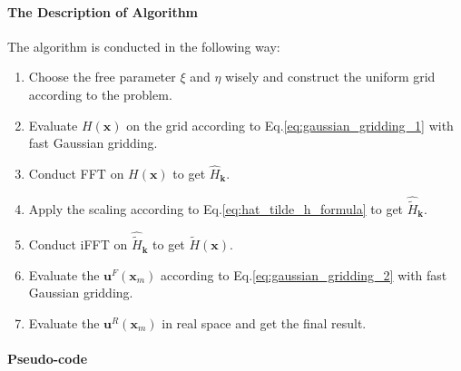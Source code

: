 \documentclass{article}[12pt]
\begin{document}
\paragraph{The Description of Algorithm}
The algorithm is conducted in the following way:
\begin{enumerate}[(1)]
	\item Choose the free parameter $\xi$ and $\eta$ wisely and construct the uniform grid according to the problem.
	\item Evaluate $H(\mathbf{x})$ on the grid according to Eq.\eqref{eq:gaussian_gridding_1} with fast Gaussian gridding.
	\item Conduct FFT on $H(\mathbf{x})$ to get $\hat{H}_{\mathbf{k}}$.
	\item Apply the scaling according to Eq.\eqref{eq:hat_tilde_h_formula} to get $\hat{\tilde{H}}_{\mathbf{k}}$.
	\item Conduct iFFT on $\hat{\tilde{H}}_{\mathbf{k}}$ to get $\tilde{H}(\mathbf{x})$.
	\item Evaluate the $\mathbf{u}^F (\mathbf{x}_m)$ according to Eq.\eqref{eq:gaussian_gridding_2} with fast Gaussian gridding.
	\item Evaluate the $\mathbf{u}^R (\mathbf{x}_m)$ in real space and get the final result.
\end{enumerate}

\paragraph{Pseudo-code}
\end{document}
